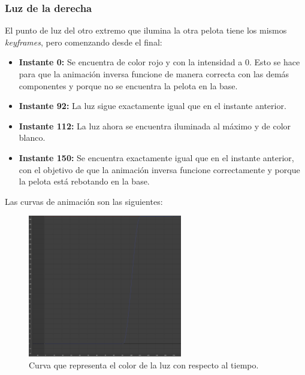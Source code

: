 \subsubsection{Luz de la derecha}

El punto de luz del otro extremo que ilumina la otra pelota tiene los mismos \textit{keyframes}, pero comenzando desde el final:

\begin{itemize}
   \item \textbf{Instante 0: }Se encuentra de color rojo y con la intensidad a 0. Esto se hace para que la animación inversa funcione de manera correcta con las demás componentes y porque no se encuentra la pelota en la base.
   \item \textbf{Instante 92: }La luz sigue exactamente igual que en el instante anterior.
   \item \textbf{Instante 112: }La luz ahora se encuentra iluminada al máximo y de color blanco.
   \item \textbf{Instante 150: }Se encuentra exactamente igual que en el instante anterior, con el objetivo de que la animación inversa funcione correctamente y porque la pelota está rebotando en la base.
\end{itemize}

\bigskip

Las curvas de animación son las siguientes:

\begin{figure}[H]
   \centering
   \includegraphics[width=0.6\textwidth]{imagenes/curvas/LR/filter.png}
   \caption{Curva que representa el color de la luz con respecto al tiempo.}
\end{figure}

